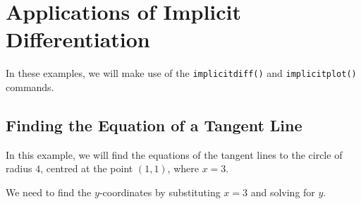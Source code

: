 
\begin{maplegroup}
\begin{mapleinput}
\end{mapleinput}
\mapleresult
\begin{maplelatex}
\end{maplelatex}
\end{maplegroup}

\section{Applications of Implicit Differentiation}
\label{sec:applications_of_implicit_differentiation}

In these examples, we will make use of the \texttt{implicitdiff()} and \texttt{implicitplot()} commands.

\subsection{Finding the Equation of a Tangent Line}
\label{subsec:implicittanline}


In this example, we will find the equations of the tangent lines to the circle of radius $4$, centred at the point $(1,1)$, where $x=3$. 

\begin{maplegroup}
\begin{mapleinput}
\end{mapleinput}
\mapleresult
\begin{maplelatex}
\end{maplelatex}
\end{maplegroup}

We need to find the $y$-coordinates by substituting $x=3$ and solving for $y$.

